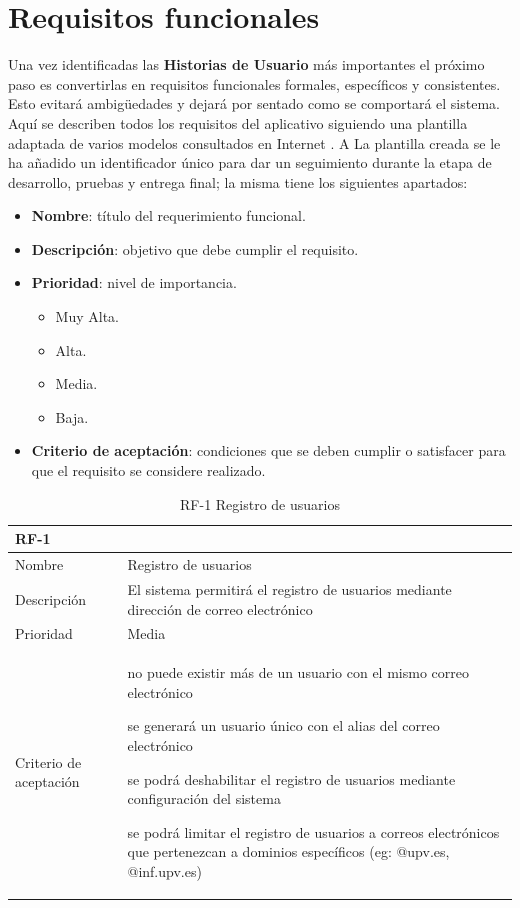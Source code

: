 \documentclass[11pt,spanish,listoffigures,listoftables]{tfgetsinf}
\begin{document}
\section{Requisitos funcionales}

Una vez identificadas las \textbf{Historias de Usuario} más importantes el próximo paso es convertirlas en requisitos funcionales formales, específicos y consistentes. Esto evitará ambigüedades y dejará por sentado como se comportará el sistema. Aquí se describen todos los requisitos del aplicativo siguiendo una plantilla adaptada de varios modelos consultados en Internet \cite{link-esp-rq-jan}. A La plantilla creada se le ha añadido un identificador único para dar un seguimiento durante la etapa de desarrollo, pruebas y entrega final; la misma tiene los siguientes apartados:

\begin{itemize}
	\item \textbf{Nombre}: título del requerimiento funcional.
	\item \textbf{Descripción}: objetivo que debe cumplir el requisito.
	\item \textbf{Prioridad}: nivel de importancia. 
	\begin{itemize}
		\item Muy Alta.
		\item Alta.
		\item Media.
		\item Baja.
	\end{itemize}
	
	\item \textbf{Criterio de aceptación}: condiciones que se deben cumplir o satisfacer para que el requisito se considere realizado.
\end{itemize}

\begin{table}[!ht]
	\centering
	\begin{tabular}{ |p{4cm}||p{10cm}|  }
		\multicolumn{2}{l}{\textbf{RF-1}} \\
		\hline
		Nombre & Registro de usuarios\\
		\hline
		Descripción & El sistema permitirá el registro de usuarios mediante dirección de correo electrónico   \\
		\hline
		Prioridad & Media\\
		\hline
		Criterio de aceptación & 
		\begin{tabitem}
			\item no puede existir más de un usuario con el mismo correo electrónico
			\item se generará un usuario único con el alias del correo electrónico
			\item se podrá deshabilitar el registro de usuarios mediante configuración del sistema
			\item se podrá limitar el registro de usuarios a correos electrónicos que pertenezcan a dominios específicos (eg: @upv.es, @inf.upv.es)
		\end{tabitem} \\
		\hline
	\end{tabular}
	\caption{RF-1 Registro de usuarios}
	\label{table:1}
\end{table}
\end{document}
